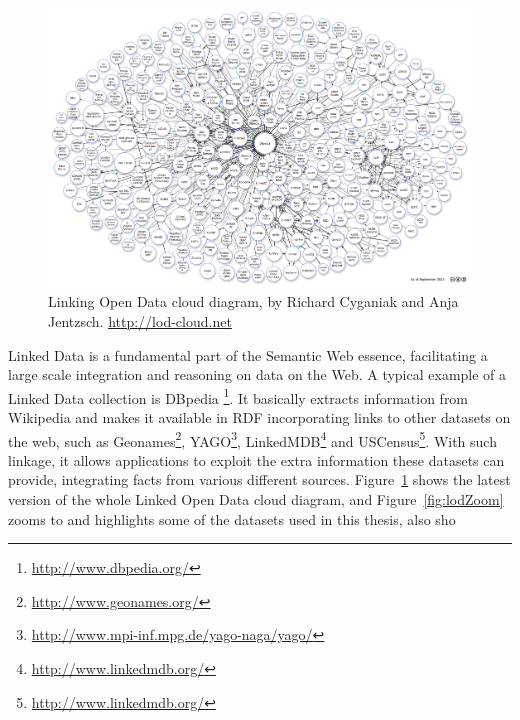 \begin{figure}[h!]
\begin{center}
  \includegraphics[width=1\linewidth]{./Figures/lod-datasets_2011-09-19.png}
\end{center}
\caption{Linking Open Data cloud diagram, by Richard Cyganiak and Anja Jentzsch. \url{http://lod-cloud.net}}
\label{fig:lod}
\end{figure}

Linked Data is a fundamental part of the Semantic Web essence, facilitating a large scale integration and reasoning
on data on the Web. A typical example of a Linked Data collection is DBpedia
{\footnote{\url{http://www.dbpedia.org/}}}. It basically extracts information from Wikipedia and
makes it available in RDF incorporating links to other datasets on the web, such as 
Geonames\footnote{\url{http://www.geonames.org/}},
YAGO\footnote{\url{http://www.mpi-inf.mpg.de/yago-naga/yago/}}, 
LinkedMDB\footnote{\url{http://www.linkedmdb.org/}} and 
USCensus\footnote{\url{http://www.linkedmdb.org/}}. 
With such linkage, it allows
applications to exploit the extra information these datasets can provide, integrating facts from various different
sources. Figure~\ref{fig:lod} shows the latest version of the whole Linked Open Data cloud
diagram, and Figure~\ref{fig:lodZoom} zooms to and highlights some of the datasets used in this thesis, also sho

